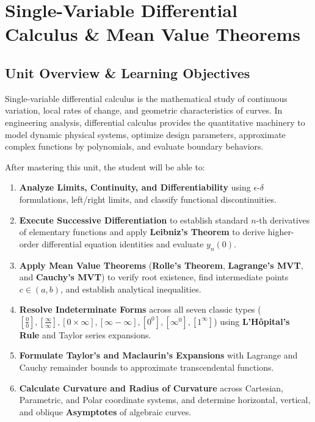 \chapter{Single-Variable Differential Calculus \& Mean Value Theorems}
\label{chap:single-variable-differential-calculus}

\section{Unit Overview \& Learning Objectives}

Single-variable differential calculus is the mathematical study of continuous variation, local rates of change, and geometric characteristics of curves. In engineering analysis, differential calculus provides the quantitative machinery to model dynamic physical systems, optimize design parameters, approximate complex functions by polynomials, and evaluate boundary behaviors.

\begin{important}
After mastering this unit, the student will be able to:
\begin{enumerate}[leftmargin=1.5em]
    \item \textbf{Analyze Limits, Continuity, and Differentiability} using $\epsilon$-$\delta$ formulations, left/right limits, and classify functional discontinuities.
    \item \textbf{Execute Successive Differentiation} to establish standard $n$-th derivatives of elementary functions and apply \textbf{Leibniz's Theorem} to derive higher-order differential equation identities and evaluate $y_n(0)$.
    \item \textbf{Apply Mean Value Theorems} (\textbf{Rolle's Theorem}, \textbf{Lagrange's MVT}, and \textbf{Cauchy's MVT}) to verify root existence, find intermediate points $c \in (a,b)$, and establish analytical inequalities.
    \item \textbf{Resolve Indeterminate Forms} across all seven classic types ($\left[\frac{0}{0}\right], \left[\frac{\infty}{\infty}\right], [0 \times \infty], [\infty - \infty], [0^0], [\infty^0], [1^\infty]$) using \textbf{L'H\^opital's Rule} and Taylor series expansions.
    \item \textbf{Formulate Taylor's and Maclaurin's Expansions} with Lagrange and Cauchy remainder bounds to approximate transcendental functions.
    \item \textbf{Calculate Curvature and Radius of Curvature} across Cartesian, Parametric, and Polar coordinate systems, and determine horizontal, vertical, and oblique \textbf{Asymptotes} of algebraic curves.
\end{enumerate}
\end{important}

